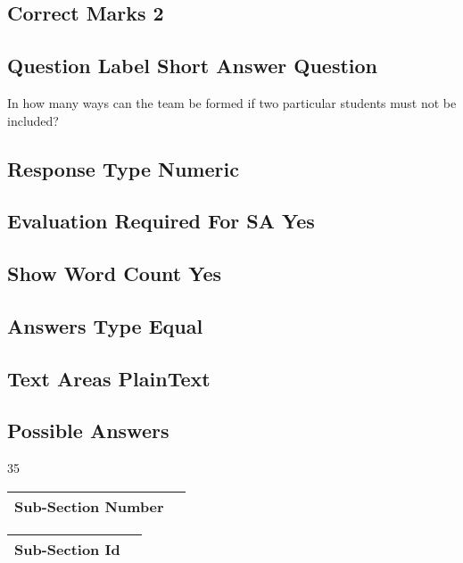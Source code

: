 \documentclass{article}
\begin{document}
\subsection{Correct Marks  2}

\subsection{Question Label  Short Answer Question}

In how many ways can the team be formed if two particular students must not be included?\\

\subsection{Response Type  Numeric}

\subsection{Evaluation Required For SA  Yes}

\subsection{Show Word Count  Yes}

\subsection{Answers Type  Equal}

\subsection{Text Areas  PlainText}

\subsection{Possible Answers }

35\\

\newpage
\begin{longtable}{|c|c|}
\hline
\textbf{Sub-Section Number} & \textbf{} \\ \hline
\end{longtable}

\begin{longtable}{|c|c|}
\hline
\textbf{Sub-Section Id} & \textbf{} \\ \hline
\end{longtable}
\end{document}
